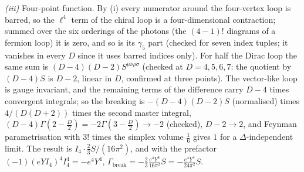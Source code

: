 \emph{(iii)} Four-point function. By (i) every numerator around the four-vertex loop is barred, so the $\ell^{4}$ term of the chiral loop is a four-dimensional contraction; summed over the six orderings of the photons (the $(4-1)!$ diagrams of a fermion loop) it is zero, and so is its $\gamma_{5}$ part (checked for seven index tuples; it vanishes in every $D$ since it uses barred indices only). For half the Dirac loop the same sum is $(D-4)(D-2)S^{\mu\nu\rho\sigma}$ (checked at $D = 4, 5, 6, 7$: the quotient by $(D-4)S$ is $D - 2$, linear in $D$, confirmed at three points). The vector-like loop is gauge invariant, and the remaining terms of the difference carry $D - 4$ times convergent integrals; so the breaking is $-(D-4)(D-2)S$ (normalised) times $4/(D(D+2))$ times the second master integral, $(D-4)\Gamma(2 - \tfrac{D}{2}) = -2\Gamma(3 - \tfrac{D}{2}) \to -2$ (checked), $D - 2 \to 2$, and Feynman parametrisation with $3!$ times the simplex volume $\tfrac16$ gives $1$ for a $\Delta$-independent limit. The result is $I_{4}\cdot\tfrac{2}{3}S/(16\pi^{2})$, and with the prefactor $(-1)(eYI_{4})^{4}I_{4}^{4} = -e^{4}Y^{4}$, $\Gamma_{\mathrm{break}} = -\tfrac{2}{3}\tfrac{e^{4}Y^{4}}{16\pi^{2}}S = -\tfrac{e^{4}Y^{4}}{24\pi^{2}}S$.

